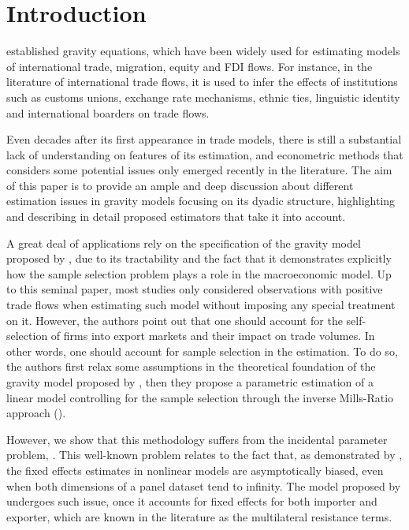 \section{Introduction} \label{introduction}
\cite{tinbergen1962shaping} established gravity equations, which have been widely used for estimating models of international trade, migration, equity and FDI flows. For instance, in the literature of international trade flows, it is used to infer the effects of institutions such as customs unions, exchange rate mechanisms, ethnic ties, linguistic identity and international boarders on trade flows. 

Even decades after its first appearance in trade models, there is still a substantial lack of understanding on features of its estimation, and econometric methods that considers some potential issues only emerged recently in the literature. The aim of this paper is to provide an ample and deep discussion about different estimation issues in gravity models focusing on its dyadic structure, highlighting and describing in detail proposed estimators that take it into account. 

A great deal of applications rely on the specification of the gravity model proposed by \cite{helpman2008estimating}, due to its tractability and the fact that it demonstrates explicitly how the sample selection problem plays a role in the macroeconomic model. Up to this seminal paper, most studies only considered observations with positive trade flows when estimating such model without imposing any special treatment on it. However, the authors point out that one should account for the self-selection of firms into export markets and their impact on trade volumes. In other words, one should account for sample selection in the estimation. To do so, the authors first relax some assumptions in the theoretical foundation of the gravity model proposed by \cite{anderson2003gravity}, then they propose a parametric estimation of a linear model controlling for the sample selection through the inverse Mills-Ratio approach (\cite{heckman1979sample}). 

However, we show that this methodology suffers from the incidental parameter problem, \cite{neyman1948consistent}. This well-known problem relates to the fact that, as demonstrated by \cite{fernandez2016individual}, the fixed effects estimates in nonlinear models are asymptotically biased, even when both dimensions of a panel dataset tend to infinity. The model proposed by \cite{helpman2008estimating} undergoes such issue, once it accounts for fixed effects for both importer and exporter, which are known in the literature as the multilateral resistance terms.

